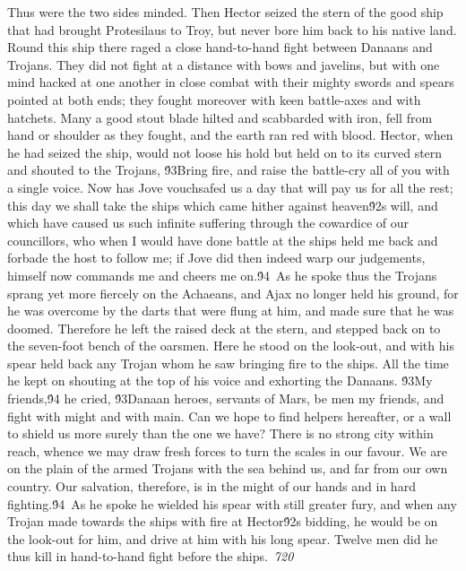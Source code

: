 {Thus were the two sides minded. Then Hector seized the stern of the good ship that had brought Protesilaus to Troy, but never bore him back to his native land. Round this ship there raged a close hand-to-hand fight between Danaans and Trojans. They did not fight at a distance with bows and javelins, but with one mind hacked at one another in close combat with their mighty swords and spears pointed at both ends; they fought moreover with keen battle-axes and with hatchets. Many a good stout blade hilted and scabbarded with iron, fell from hand or shoulder as they fought, and the earth ran red with blood. Hector, when he had seized the ship, would not loose his hold but held on to its curved stern and shouted to the Trojans, \'93Bring fire, and raise the battle-cry all of you with a single voice. Now has Jove vouchsafed us a day that will pay us for all the rest; this day we shall take the ships which came hither against heaven\'92s will, and which have caused us such infinite suffering through the cowardice of our councillors, who when I would have done battle at the ships held me back and forbade the host to follow me; if Jove did then indeed warp our judgements, himself now commands me and cheers me on.\'94\
As he spoke thus the Trojans sprang yet more fiercely on the Achaeans, and Ajax no longer held his ground, for he was overcome by the darts that were flung at him, and made sure that he was doomed. Therefore he left the raised deck at the stern, and stepped back on to the seven-foot bench of the oarsmen. Here he stood on the look-out, and with his spear held back any Trojan whom he saw bringing fire to the ships. All the time he kept on shouting at the top of his voice and exhorting the Danaans. \'93My friends,\'94 he cried, \'93Danaan heroes, servants of Mars, be men my friends, and fight with might and with main. Can we hope to find helpers hereafter, or a wall to shield us more surely than the one we have? There is no strong city within reach, whence we may draw fresh forces to turn the scales in our favour. We are on the plain of the armed Trojans with the sea behind us, and far from our own country. Our salvation, therefore, is in the might of our hands and in hard fighting.\'94\
As he spoke he wielded his spear with still greater fury, and when any Trojan made towards the ships with fire at Hector\'92s bidding, he would be on the look-out for him, and drive at him with his long spear. Twelve men did he thus kill in hand-to-hand fight before the ships.\
\pard{}\sl720\qc{}

}

